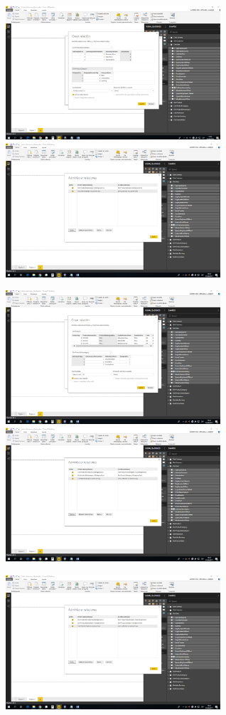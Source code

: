 \begin{itemize}
\begin{enumerate}
\includegraphics[width=8cm]{./Imagenes/10.png} \includegraphics[width=8cm]{./Imagenes/11.png}

\includegraphics[width=8cm]{./Imagenes/12.png} \includegraphics[width=8cm]{./Imagenes/13.png}

\begin{center}
\includegraphics[width=8cm]{./Imagenes/13.png}
\end{center}

\end{enumerate}







\end{itemize}







